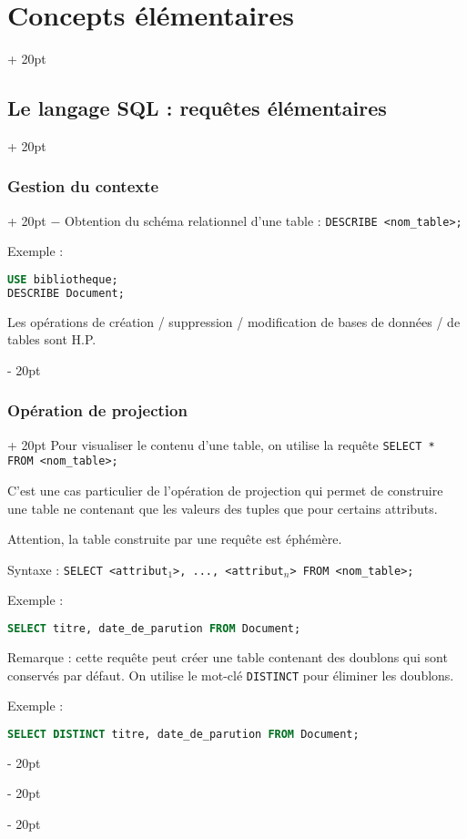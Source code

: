 \documentclass[a4paper, 12pt, twoside]{article}
\newcommand{\ind}[1][20pt]{\advance\leftskip + #1}
\newcommand{\deind}[1][20pt]{\advance\leftskip - #1}
\newenvironment{indt}[2][20pt]{#2 \par \ind[#1]}{\par \deind} %
\begin{document}
\begin{indt}{\section{Concepts élémentaires}}
\begin{indt}{\subsection{Le langage SQL : requêtes élémentaires}}
\begin{indt}{\subsubsection{Gestion du contexte}}
                $-$ Obtention du schéma relationnel d'une table : \texttt{DESCRIBE <nom\_table>;}
                
                Exemple :
                
                \begin{lstlisting}[language=SQL, xleftmargin=80pt]
USE bibliotheque;
DESCRIBE Document;\end{lstlisting}
                
                Les opérations de création / suppression / modification de bases de données / de tables sont H.P.
            \end{indt}
            
            \vspace{12pt}
            
            \begin{indt}{\subsubsection{Opération de projection}}
                Pour visualiser le contenu d'une table, on utilise la requête \texttt{SELECT * FROM <nom\_table>;}
                
                C'est une cas particulier de l'opération de projection qui permet de construire une table ne contenant que les valeurs des tuples que pour certains attributs.
                
                Attention, la table construite par une requête est éphémère.
                
                Syntaxe :
                \texttt{SELECT <attribut$_1$>, ..., <attribut$_n$> FROM <nom\_table>;}
                
                Exemple :
                \begin{lstlisting}[language=SQL, xleftmargin=80pt]
SELECT titre, date_de_parution FROM Document;\end{lstlisting}
                
                Remarque : cette requête peut créer une table contenant des doublons qui sont conservés par défaut. On utilise le mot-clé \texttt{DISTINCT} pour éliminer les doublons.
                
                Exemple :
                \begin{lstlisting}[language=SQL, xleftmargin=80pt]
SELECT DISTINCT titre, date_de_parution FROM Document;\end{lstlisting}
               

\end{indt}
\end{indt}
\end{indt}
\end{document}
